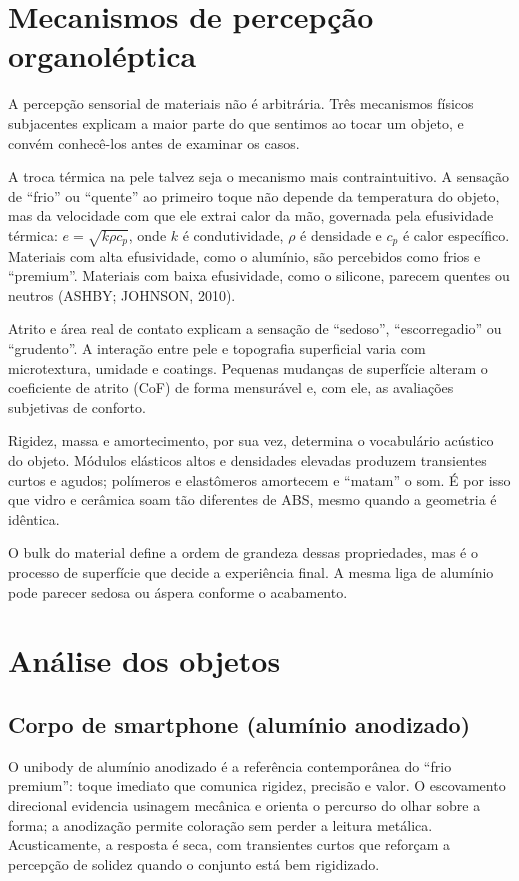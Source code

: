 \documentclass[
  12pt,
  a4paper,
  oneside,
  brazil,
  chapter=TITLE
]{article}
\newcommand{\secbreak}{\clearpage}
\let\oldsection\section
\renewcommand{\section}{\secbreak\oldsection}
\begin{document}
\section{Mecanismos de percepção organoléptica}

A percepção sensorial de materiais não é arbitrária. Três mecanismos físicos subjacentes
explicam a maior parte do que sentimos ao tocar um objeto, e convém conhecê-los antes de
examinar os casos.

A troca térmica na pele talvez seja o mecanismo mais contraintuitivo. A sensação de
``frio'' ou ``quente'' ao primeiro toque não depende da temperatura do objeto, mas da
velocidade com que ele extrai calor da mão, governada pela efusividade térmica:
$e = \sqrt{k \rho c_p}$, onde $k$ é condutividade, $\rho$ é densidade e $c_p$ é calor
específico. Materiais com alta efusividade, como o alumínio, são percebidos como frios
e ``premium''. Materiais com baixa efusividade, como o silicone, parecem quentes ou
neutros (ASHBY; JOHNSON, 2010).

Atrito e área real de contato explicam a sensação de ``sedoso'', ``escorregadio'' ou
``grudento''. A interação entre pele e topografia superficial varia com microtextura,
umidade e coatings. Pequenas mudanças de superfície alteram o coeficiente de atrito (CoF)
de forma mensurável e, com ele, as avaliações subjetivas de conforto.

Rigidez, massa e amortecimento, por sua vez, determina o vocabulário acústico do objeto.
Módulos elásticos altos e densidades elevadas produzem transientes curtos e agudos;
polímeros e elastômeros amortecem e ``matam'' o som. É por isso que vidro e cerâmica soam
tão diferentes de ABS, mesmo quando a geometria é idêntica.

O bulk do material define a ordem de grandeza dessas propriedades, mas é o processo de
superfície que decide a experiência final. A mesma liga de alumínio pode parecer sedosa
ou áspera conforme o acabamento.


\section{Análise dos objetos}

\subsection{Corpo de smartphone (alumínio anodizado)}

O unibody de alumínio anodizado é a referência contemporânea do ``frio premium'': toque
imediato que comunica rigidez, precisão e valor. O escovamento direcional evidencia
usinagem mecânica e orienta o percurso do olhar sobre a forma; a anodização permite
coloração sem perder a leitura metálica. Acusticamente, a resposta é seca, com transientes
curtos que reforçam a percepção de solidez quando o conjunto está bem rigidizado.
\end{document}
